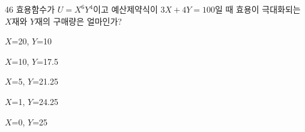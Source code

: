 \begin{question}{46}
효용함수가 $U=X^{ 6 } Y^{ 4 }$이고 예산제약식이 $3X + 4Y = 100$일 때 효용이 극대화되는 $X$재와 $Y$재의 구매량은 얼마인가?
\begin{choices}
  \item $X$=20, $Y$=10
  \item $X$=10, $Y$=17.5
  \item $X$=5, $Y$=21.25
  \item $X$=1, $Y$=24.25
  \item $X$=0, $Y$=25
\end{choices}
\end{question}
